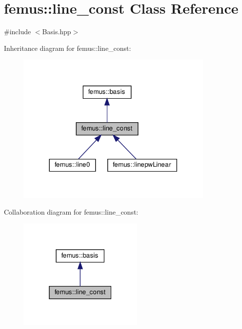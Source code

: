 \hypertarget{classfemus_1_1line__const}{}\section{femus\+:\+:line\+\_\+const Class Reference}
\label{classfemus_1_1line__const}


{\ttfamily \#include $<$Basis.\+hpp$>$}



Inheritance diagram for femus\+:\+:line\+\_\+const\+:
\nopagebreak
\begin{figure}[H]
\begin{center}
\leavevmode
\includegraphics[width=276pt]{classfemus_1_1line__const__inherit__graph}
\end{center}
\end{figure}


Collaboration diagram for femus\+:\+:line\+\_\+const\+:
\nopagebreak
\begin{figure}[H]
\begin{center}
\leavevmode
\includegraphics[width=175pt]{classfemus_1_1line__const__coll__graph}
\end{center}
\end{figure}
